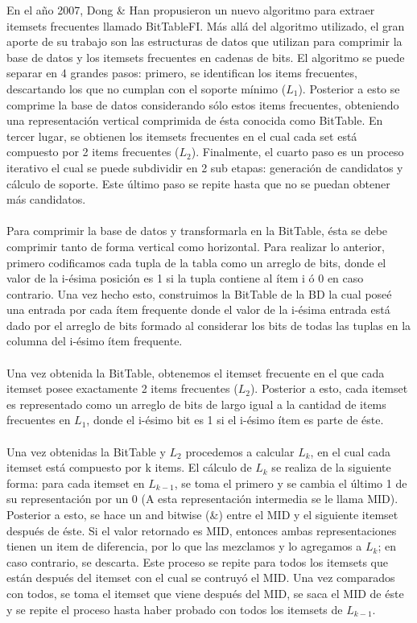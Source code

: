 \documentclass[12pt,spanish]{article}
\begin{document}
En el año 2007, Dong \& Han propusieron un nuevo algoritmo para extraer itemsets frecuentes llamado BitTableFI. Más allá del algoritmo utilizado, el gran aporte de su trabajo son las estructuras de datos que utilizan para comprimir la base de datos y los itemsets frecuentes en cadenas de bits. El algoritmo se puede separar en 4 grandes pasos: primero, se identifican los items frecuentes, descartando los que no cumplan con el soporte mínimo ($L_1$). Posterior a esto se comprime la base de datos considerando sólo estos items frecuentes, obteniendo una representación vertical comprimida de ésta conocida como BitTable. En tercer lugar, se obtienen los itemsets frecuentes en el cual cada set está compuesto por 2 items frecuentes ($L_2$). Finalmente, el cuarto paso es un proceso iterativo el cual se puede subdividir en 2 sub etapas: generación de candidatos y cálculo de soporte. Este último paso se repite hasta que no se puedan obtener más candidatos.
\\\\
Para comprimir la base de datos y transformarla en la BitTable, ésta se debe comprimir tanto de forma vertical como horizontal. Para realizar lo anterior, primero codificamos cada tupla de la tabla como un arreglo de bits, donde el valor de la i-ésima posición es 1 si la tupla contiene al ítem i ó 0 en caso contrario. Una vez hecho esto, construimos la BitTable de la BD la cual poseé una entrada por cada ítem frequente donde el valor de la i-ésima entrada está dado por el arreglo de bits formado al considerar los bits de todas las tuplas en la columna del i-ésimo ítem frequente.
\\\\
Una vez obtenida la BitTable, obtenemos el itemset frecuente en el que cada itemset posee exactamente 2 items frecuentes ($L_2$). Posterior a esto, cada itemset es representado como un arreglo de bits de largo igual a la cantidad de items frecuentes en $L_1$, donde el i-ésimo bit es 1 si el i-ésimo ítem es parte de éste.
\\\\
Una vez obtenidas la BitTable y $L_2$ procedemos a calcular $L_k$, en el cual cada itemset está compuesto por k items. El cálculo de $L_k$ se realiza de la siguiente forma: para cada itemset en $L_{k-1}$, se toma el primero y se cambia el último 1 de su representación por un 0 (A esta representación intermedia se le llama MID). Posterior a esto, se hace un and bitwise (\&) entre el MID y el siguiente itemset después de éste. Si el valor retornado es MID, entonces ambas representaciones tienen un item de diferencia, por lo que las mezclamos y lo agregamos a $L_k$; en caso contrario, se descarta. Este proceso se repite para todos los itemsets que están después del itemset con el cual se contruyó el MID. Una vez comparados con todos, se toma el itemset que viene después del MID, se saca el MID de éste y se repite el proceso hasta haber probado con todos los itemsets de $L_{k-1}$.
\end{document}
